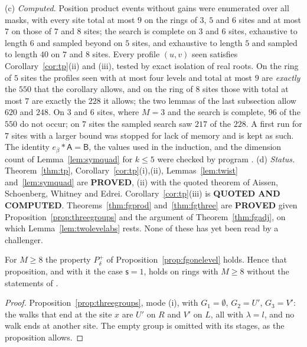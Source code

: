 \begin{remark}
(c) \emph{Computed.} Position product events without gains were enumerated over all masks, with every site total at most $9$ on the rings of $3$, $5$ and $6$ sites and at most $7$ on those of $7$ and $8$ sites; the search is complete on $3$ and $6$ sites, exhaustive to length $6$ and sampled beyond on $5$ sites, and exhaustive to length $5$ and sampled to length $40$ on $7$ and $8$ sites. Every profile $(u,v)$ seen satisfies Corollary~\ref{cor:tp}(ii) and (iii), tested by exact isolation of real roots. On the ring of $5$ sites the profiles seen with at most four levels and total at most $9$ are \emph{exactly} the $550$ that the corollary allows, and on the ring of $8$ sites those with total at most $7$ are exactly the $228$ it allows; the two lemmas of the last subsection allow $620$ and $248$. On $3$ and $6$ sites, where $M=3$ and the search is complete, $96$ of the $550$ do not occur; on $7$ sites the sampled search saw $217$ of the $228$. A first run for $7$ sites with a larger bound was stopped for lack of memory and is kept as such. The identity $e_\beta*\mathsf{A}=\mathsf{B}$, the values used in the induction, and the dimension count of Lemma~\ref{lem:symquad} for $k\le5$ were checked by program \cite{comptp}.
(d) \emph{Status.} Theorem~\ref{thm:tp}, Corollary~\ref{cor:tp}(i),(ii), Lemmas~\ref{lem:twist} and~\ref{lem:symquad} are \textbf{PROVED}, (ii) with the quoted theorem of Aissen, Schoenberg, Whitney and Edrei. Corollary~\ref{cor:tp}(iii) is \textbf{QUOTED AND COMPUTED}. Theorems~\ref{thm:fgprod} and~\ref{thm:fgthree} are \textbf{PROVED} given Proposition~\ref{prop:threegroups} and the argument of Theorem~\ref{thm:fgadj}, on which Lemma~\ref{lem:twolevelabs} rests. None of these has yet been read by a challenger.
\end{remark}

\begin{corollary}\label{cor:pplus8}
For $M\ge8$ the property $P^{+}_\delta$ of Proposition~\ref{prop:fgonelevel} holds. Hence that proposition, and with it the case $\mathsf{s}=1$, holds on rings with $M\ge8$ without the statements of \cite{dgone}.
\end{corollary}
\begin{proof}
Proposition~\ref{prop:threegroups}, mode (i), with $G_1=\emptyset$, $G_2=U'$, $G_3=V'$: the walks that end at the site $x$ are $U'$ on $R$ and $V'$ on $L$, all with $\lambda=l$, and no walk ends at another site. The empty group is omitted with its stages, as the proposition allows.
\end{proof}

